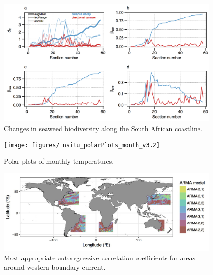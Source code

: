 \documentclass[]{book}
\theoremstyle{definition}
\theoremstyle{definition}
\theoremstyle{definition}
\theoremstyle{remark}
\begin{document}
\begin{figure}

{\centering \includegraphics[width=1\linewidth]{figures/Ecography_figure5a-d} 

}

\caption{Changes in seaweed biodiversity along the South African coastline.}\label{fig:example4}
\end{figure}

\begin{figure}

{\centering \texttt{[image: figures/insitu\_polarPlots\_month\_v3.2]} 

}

\caption{Polar plots of monthly temperatures.}\label{fig:example16}
\end{figure}

\begin{figure}

{\centering \includegraphics[width=1\linewidth]{figures/mo_coef} 

}

\caption{Most appropriate autoregressive correlation coefficients for areas around western boundary current.}\label{fig:example9}
\end{figure}
\end{document}
